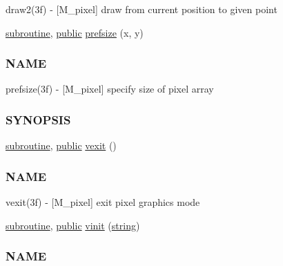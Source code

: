 \begin{DoxyCompactItemize}
\begin{DoxyCompactList}
draw2(3f) -\/ \mbox{[}M\+\_\+pixel\mbox{]} draw from current position to given point \end{DoxyCompactList}\item 
\hyperlink{M__stopwatch_83_8txt_acfbcff50169d691ff02d4a123ed70482}{subroutine}, \hyperlink{M__stopwatch_83_8txt_a2f74811300c361e53b430611a7d1769f}{public} \hyperlink{namespacem__pixel_acc868686f05b7e0b3cd33bf9d1c6bb98}{prefsize} (x, y)
\begin{DoxyCompactList}\small\item\em \subsubsection*{N\+A\+ME}

prefsize(3f) -\/ \mbox{[}M\+\_\+pixel\mbox{]} specify size of pixel array \subsubsection*{S\+Y\+N\+O\+P\+S\+IS}\end{DoxyCompactList}\item 
\hyperlink{M__stopwatch_83_8txt_acfbcff50169d691ff02d4a123ed70482}{subroutine}, \hyperlink{M__stopwatch_83_8txt_a2f74811300c361e53b430611a7d1769f}{public} \hyperlink{namespacem__pixel_a19ad6b65752322b0029a62cc0ebec3e8}{vexit} ()
\begin{DoxyCompactList}\small\item\em \subsubsection*{N\+A\+ME}

vexit(3f) -\/ \mbox{[}M\+\_\+pixel\mbox{]} exit pixel graphics mode \end{DoxyCompactList}\item 
\hyperlink{M__stopwatch_83_8txt_acfbcff50169d691ff02d4a123ed70482}{subroutine}, \hyperlink{M__stopwatch_83_8txt_a2f74811300c361e53b430611a7d1769f}{public} \hyperlink{namespacem__pixel_ac03ca8f23fdadb60599b6ea4dc87a6d9}{vinit} (\hyperlink{what__overview_81_8txt_a74cb7e955273b9f9157b4f0c18a38849}{string})
\begin{DoxyCompactList}\small\item\em \subsubsection*{N\+A\+ME}


\end{DoxyCompactList}
\end{DoxyCompactItemize}
